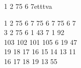 \begin{song}{1 2 75 6 7}{etttva}
\begin{vers}
1 2 75 6 7 75 6 7 75 6 7\\
3 2 75 6 1 43 7 1 92\\
103 102 101 105 6 19 47\\
19 18 17 16 15 14 13 11\\
16 17 18 19 13 55\\
\end{vers}
\end{song}
